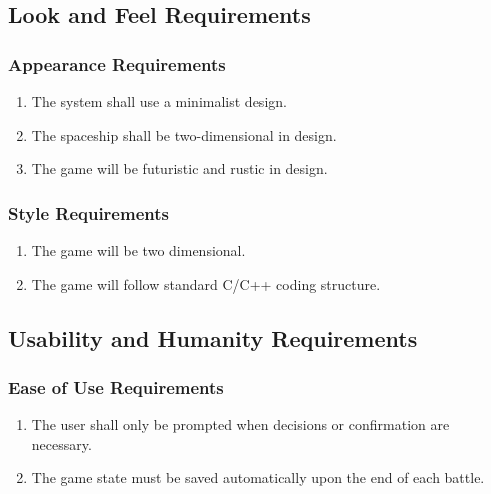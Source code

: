 \documentclass[]{article}
\begin{document}
\subsection{Look and Feel Requirements}
\label{sub:look_and_feel_requirements}

\subsubsection{Appearance Requirements}
\label{ssub:appearance_requirements}
\begin{enumerate}[{LF}1. ]
	\item The system shall use a minimalist design.
	\item The spaceship shall be two-dimensional in design.
	\item The game will be futuristic and rustic in design.
\end{enumerate}

\subsubsection{Style Requirements}
\label{ssub:style_requirements}
\begin{enumerate}[{LF}1. ]
	\item The game will be two dimensional.
	\item The game will follow standard C/C++ coding structure.
\end{enumerate}


\subsection{Usability and Humanity Requirements}
\label{sub:usability_and_humanity_requirements}

\subsubsection{Ease of Use Requirements}
\label{ssub:ease_of_use_requirements}
\begin{enumerate}[{UH}1. ]
	\item The user shall only be prompted when decisions or confirmation are necessary.
	\item The game state must be saved automatically upon the end of each battle.
\end{enumerate}
\end{document}
